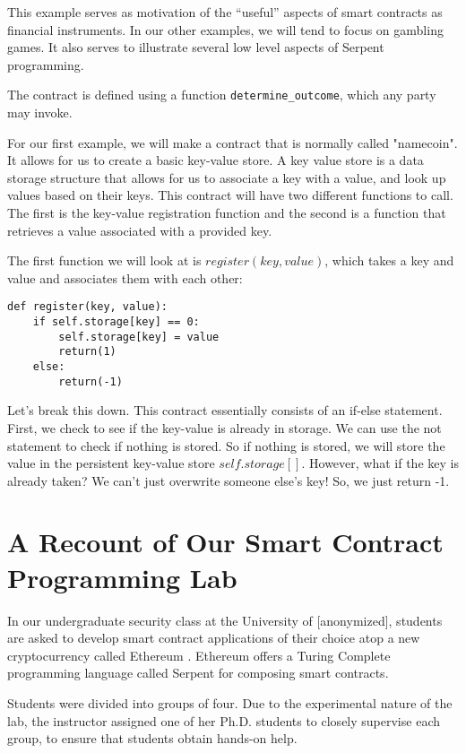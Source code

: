 \documentclass[10pt,twocolumn,letterpaper]{article}
\newcommand{\elaine}[1]{{\color{red}{[elaine: #1]}}}
\begin{document}
This example serves as motivation of the ``useful'' aspects of smart contracts as financial instruments. In our other examples, we will tend to focus on gambling games. It also serves to illustrate several low level aspects of Serpent programming.

The contract is defined using a function \texttt{determine\_outcome}, which any party may invoke.

For our first example, we will make a contract that is normally called "namecoin". It allows for us to create a basic key-value store. A key value store is a data storage structure that allows for us to associate a key with a value, and look up values based on their keys. This contract will have two different functions to call. The first is the key-value registration function and the second is a function that retrieves a value associated with a provided key.

The first function we will look at is $register(key, value)$, which takes a key and value and associates them with each other:

\begin{mdframed}
\begin{verbatim}
def register(key, value):
	if self.storage[key] == 0:
		self.storage[key] = value
		return(1)
	else:
		return(-1)
\end{verbatim}
\end{mdframed}

Let's break this down. This contract essentially consists of an if-else statement. First, we check to see if the key-value is already in storage. We can use the not statement to check if nothing is stored. So if nothing is stored, we will store the value in the persistent key-value store $self.storage[]$. However, what if the key is already taken? We can't just overwrite someone else's key! So, we just return -1. 

\section{A Recount of Our Smart Contract Programming Lab}
In our undergraduate security class at the University of [anonymized], 
students are asked to develop smart contract applications of their choice
atop a new cryptocurrency called Ethereum \elaine{cite}.
Ethereum offers a Turing Complete programming language
called Serpent \elaine{cite} for composing smart contracts. 

Students were divided into groups of four.  
Due to the experimental nature of the lab, 
the instructor assigned one of her Ph.D. students 
to closely supervise each group, to ensure that students
obtain hands-on help.
\end{document}
